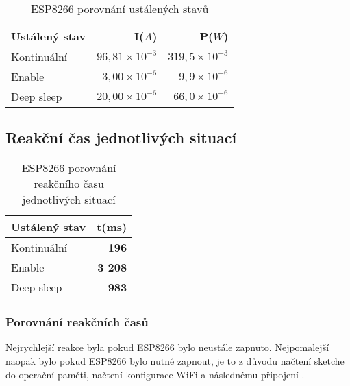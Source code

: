 \documentclass[a4paper, 12pt]{report}
\begin{document}
					\begin{table}[h]
						\centering
						\caption{ESP8266 porovnání ustálených stavů}
						\begin{tabular}{||l|r r||}
							\hline
							Ustálený stav & I($A$) & P($W$)\\
							\hline
							Kontinuální & $96,81 \times 10^{-3}$ & $319,5 \times 10^{-3}$\\
							Enable & $3,00\times 10^{-6}$ & $9,9 \times 10^{-6}$\\
							Deep sleep & $20,00\times 10^{-6}$ & $66,0 \times 10^{-6}$\\
							\hline
						\end{tabular}
						\label{ESP8266 klidové režimy}
					\end{table}

			\subsection{Reakční čas jednotlivých situací}

				\begin{table}[]
					\centering
					\caption{ESP8266 porovnání reakčního času jednotlivých situací}
					\begin{tabular}{||l|r||}
						\hline
						Ustálený stav & t(ms)\\
						\hline
						Kontinuální & {\bf 196}\\
						Enable & {\bf 3 208}\\
						Deep sleep & {\bf 983}\\
						\hline
					\end{tabular}
					\label{ESP8266 klidové režimy čas}
				\end{table}

				\subsubsection{Porovnání reakčních časů}
					Nejrychlejší reakce byla pokud ESP8266 bylo neustále zapnuto. Nejpomalejší naopak bylo pokud ESP8266 bylo nutné zapnout, je to z důvodu načtení sketche do operační paměti, načtení konfigurace WiFi a následnému připojení .
\end{document}
